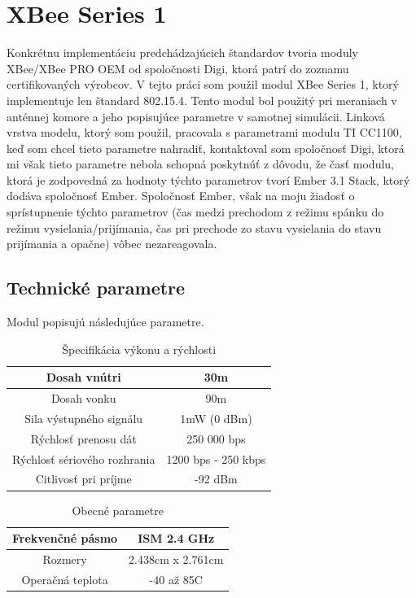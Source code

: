 \documentclass[11pt,twoside,a4paper]{book}
\begin{document}
\section{XBee Series 1}
Konkrétnu implementáciu predchádzajúcich štandardov tvoria moduly XBee/XBee PRO OEM od spoločnosti Digi, ktorá patrí do zoznamu certifikovaných výrobcov. V tejto práci som použil modul XBee Series 1, ktorý implementuje len štandard 802.15.4. Tento modul bol použitý pri meraniach v anténnej komore a jeho popisujúce parametre v samotnej simulácii. Linková vrstva modelu, ktorý som použil, pracovala s parametrami modulu TI CC1100, keď som chcel tieto parametre nahradiť, kontaktoval som spoločnosť Digi, ktorá mi však tieto parametre nebola schopná poskytnúť z dôvodu, že časť modulu, ktorá je zodpovedná za hodnoty týchto parametrov tvorí Ember 3.1 Stack, ktorý dodáva spoločnosť Ember. Spoločnosť Ember, však na moju žiadosť o sprístupnenie týchto parametrov (čas medzi prechodom z režimu spánku do režimu vysielania/prijímania, čas pri prechode zo stavu vysielania do stavu prijímania a opačne) vôbec nezareagovala.

\subsection{Technické parametre}
Modul popisujú následujúce parametre\cite{XBee}.

\begin{table}[htbp]
\begin{center}
\begin{tabular}{|c|c|}
\hline Dosah vnútri & 30m \\ 
\hline Dosah vonku & 90m \\ 
\hline Sila výstupného signálu & 1mW (0 dBm) \\
\hline Rýchlosť prenosu dát & 250 000 bps \\ 
\hline Rýchlosť sériového rozhrania & 1200 bps - 250 kbps \\ 
\hline Citlivosť pri príjme & -92 dBm \\
\hline 
\end{tabular} 
\end{center}
\caption{Špecifikácia výkonu a rýchlosti}
\label{tab:tab1}
\end{table}

\begin{table}[htbp]
\begin{center}
\begin{tabular}{|c|c|}
\hline Frekvenčné pásmo & ISM 2.4 GHz \\ 
\hline Rozmery & 2.438cm x 2.761cm \\ 
\hline Operačná teplota & -40 až 85C \\ 
\hline 
\end{tabular} 
\end{center}
\caption{Obecné parametre}
\label{tab:tab2}
\end{table}
\end{document}
